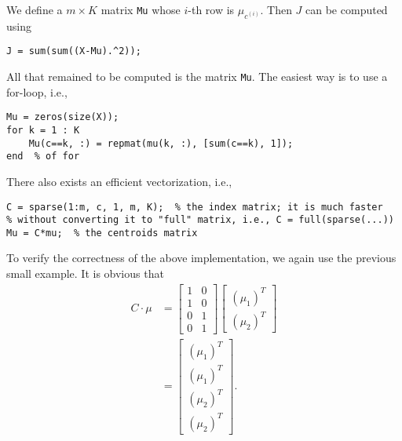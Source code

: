 \documentclass{article}
\begin{document}
We define a $m\times K$ matrix \texttt{Mu} whose $i$-th row is $\mu_{c^{(i)}}$. Then $J$ can be computed using
\begin{verbatim}
J = sum(sum((X-Mu).^2));
\end{verbatim}
All that remained to be computed is the matrix \texttt{Mu}. The easiest way is to use a for-loop, i.e.,
\begin{verbatim}
Mu = zeros(size(X));
for k = 1 : K
    Mu(c==k, :) = repmat(mu(k, :), [sum(c==k), 1]);
end  % of for
\end{verbatim}
There also exists an efficient vectorization, i.e.,
\begin{verbatim}
C = sparse(1:m, c, 1, m, K);  % the index matrix; it is much faster
% without converting it to "full" matrix, i.e., C = full(sparse(...))
Mu = C*mu;  % the centroids matrix
\end{verbatim}
To verify the correctness of the above implementation, we again use the previous small example. It is obvious that
\[
\begin{split}
C\cdot \mu &=
\left[\begin{array}{cc}
1 & 0 \\
1 & 0\\
0 & 1\\
0 & 1
\end{array}\right]
\left[\begin{array}{c}
(\mu_1)^T\\
(\mu_2)^T
\end{array}\right]\\
&=
\left[\begin{array}{c}
(\mu_1)^T \\
(\mu_1)^T\\
(\mu_2)^T\\
(\mu_2)^T
\end{array}\right].
\end{split}
\]
\end{document}

